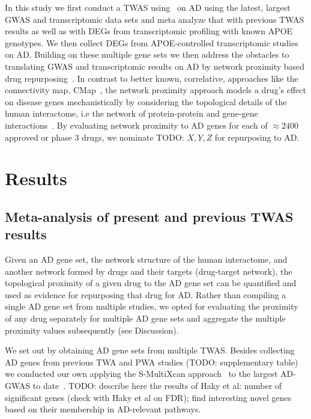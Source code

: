 \documentclass[letterpaper]{article}
\begin{document}
In this study we first conduct a TWAS using~\citep{Barbeira2018} on AD using the
latest, largest GWAS and transcriptomic data sets and meta analyze that with
previous TWAS results as well as with DEGs from transcriptomic profiling with
known APOE genotypes.  We then collect DEGs from APOE-controlled
transcriptomic studies on AD.  Building on these multiple gene sets we then
address the obstacles to translating GWAS and transcriptomic results on AD by
network proximity based drug repurposing~\citep{Cheng2018}.  In contrast to
better known, correlative, approaches like the connectivity map,
CMap~\citep{Lamb2006}, the network proximity approach models a drug's effect
on disease genes mechanistically by considering the topological details of the
human interactome, i.e the network of protein-protein and gene-gene
interactions~\citep{Guney2016,Barabasi2011}.  By evaluating network proximity
to AD genes for each of $\approx 2400$ approved or phase 3 drugs, we nominate
TODO: $X, Y, Z$ for repurposing to AD.

\section{Results}

\subsection{Meta-analysis of present and previous TWAS results}

Given an AD gene set, the network structure of the human interactome, and
another network formed by drugs and their targets (drug-target network), the
topological proximity of a given drug to the AD gene set can be
quantified\citep{Guney2016} and used as evidence for repurposing that drug for
AD.  Rather than compiling a single AD gene set from multiple studies, we
opted for evaluating the proximity of any drug separately for multiple AD gene
sets and aggregate the multiple proximity values subsequently (see
Discussion).

We set out by obtaining AD gene sets from multiple TWAS.  Besides collecting
AD genes from previous TWA and PWA studies (TODO: supplementary table) we
conducted our own applying the S-MultiXcan approach~\citep{Barbeira2018} to
the largest AD-GWAS to date~\citep{Schwartzentruber2021}.  TODO: describe
here the results of Haky et al: number of significant genes (check with Haky
et al on FDR); find interesting novel genes based on their membership in
AD-relevant pathways.
\end{document}
